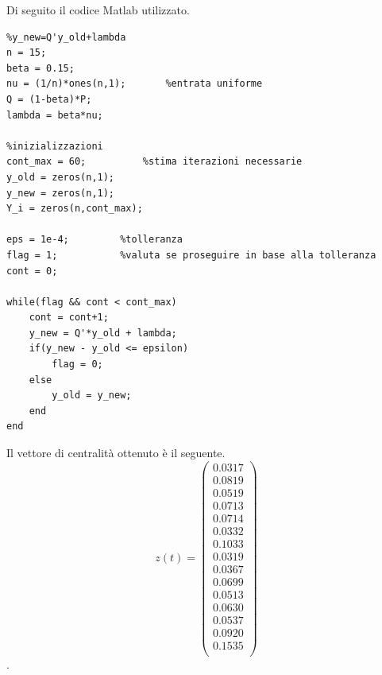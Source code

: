 \documentclass[13pt,largemargins]{homework}
\begin{document}
\begin{enumerate}[label=(\alph*)]
Di seguito il codice Matlab utilizzato. 

\begin{lstlisting}
%y_new=Q'y_old+lambda
n = 15; 
beta = 0.15; 
nu = (1/n)*ones(n,1);       %entrata uniforme
Q = (1-beta)*P; 
lambda = beta*nu;

%inizializzazioni
cont_max = 60;       	%stima iterazioni necessarie
y_old = zeros(n,1); 
y_new = zeros(n,1);
Y_i = zeros(n,cont_max); 

eps = 1e-4;         %tolleranza
flag = 1;           %valuta se proseguire in base alla tolleranza
cont = 0; 

while(flag && cont < cont_max)
    cont = cont+1; 
    y_new = Q'*y_old + lambda;
    if(y_new - y_old <= epsilon)
        flag = 0; 
    else
        y_old = y_new; 
    end 
end
\end{lstlisting}

Il vettore di centralità ottenuto è il seguente.
\[z(t)=\begin{pmatrix}
0.0317\\ 
0.0819\\ 0.0519\\ 0.0713\\ 0.0714\\ 0.0332\\ 0.1033\\ 0.0319\\ 0.0367\\ 0.0699\\ 0.0513\\ 0.0630\\ 0.0537\\ 0.0920\\ 0.1535\\
\end{pmatrix}\]. 






\end{enumerate}
\end{document}
